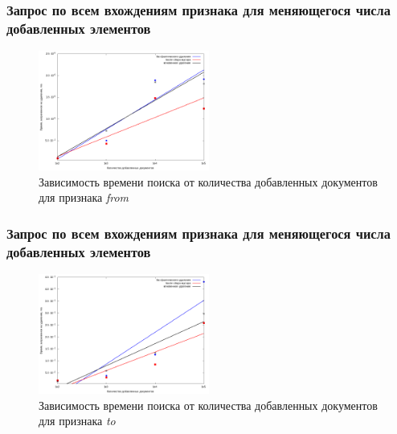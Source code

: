 \documentclass[aspectratio=169, pdf, 8pt, unicode]{beamer}
\begin{document}
\begin{frame}[fragile]
\frametitle{Запрос по всем вхождениям признака для меняющегося числа
добавленных элементов}
\begin{figure}[H]
\centering
\includegraphics[width=0.5\textwidth]{fig/from.png}
\caption{Зависимость времени поиска от количества добавленных документов для признака \textit{from}}
\end{figure}
\end{frame}

\begin{frame}[fragile]
\frametitle{Запрос по всем вхождениям признака для меняющегося числа
добавленных элементов}
\begin{figure}[H]
\centering
\includegraphics[width=0.5\textwidth]{fig/to.png}
\caption{Зависимость времени поиска от количества добавленных документов для признака \textit{to}}
\end{figure}
\end{frame}
\end{document}
